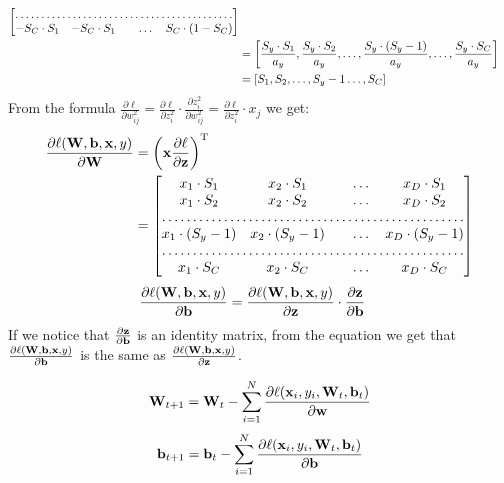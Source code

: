 \documentclass[10pt,a4paper]{article}
\begin{document}
\begin{enumerate}
\begin{align}
\begin{bmatrix}
    \hdotsfor{5} \\
        -S_C \cdot S_1    & 
-S_C \cdot S_1      &  & \dots & S_C \cdot (1 - S_C) \\
\end{bmatrix}\\
&= \left[ \frac{S_y\cdot S_1 }{a_y},\frac{S_y \cdot S_2 }{a_y}, \dots, \frac{S_y \cdot (S_y - 1) }{a_y}, \dots, \frac{S_y \cdot S_C }{a_y}\right]\\
&=  \left[ S_1 ,S_2, \dots, S_y - 1 \dots, S_C \right]
\end{align}
From the formula $\frac { \partial \ell } { \partial w _ { i j } ^ { 2 } } = \frac { \partial \ell } { \partial z _ { i } ^ { 2 } } \cdot \frac { \partial z _ { i } ^ { 2 } } { \partial w _ { i j } ^ { 2 } } = \frac { \partial \ell } { \partial z _ { i } ^ { 2 } } \cdot x _ { j }$ we get:
\begin{align}
\frac{\partial \ell (\mat{W}, \vect{b}, \vect{x}, y)}{\partial \mat{W}} 
&=\transpose{\left( \vect{x} \frac{\partial \ell}{\partial \vect{z}}\right)}\\
&=\begin{bmatrix}
    x_1 \cdot S_1   & 
x_2 \cdot S_1      &  & \dots  & x_D\cdot S_1 \\
 x_1 \cdot S_2    & 
x_2 \cdot S_2 &  & \dots & x_D \cdot S_2 \\
    \hdotsfor{5} \\
     x_1 \cdot (S_y -1)    & 
x_2 \cdot (S_y -1) &  & \dots & x_D \cdot (S_y -1) \\
    \hdotsfor{5} \\
        x_1 \cdot S_C    & 
x_2 \cdot S_C &     &  \dots& x_D \cdot  S_C \\
\end{bmatrix}\\
\end{align}
\begin{align}
\frac{\partial \ell(\textbf{\text{{W}}}, \textbf{\text{{b}}}, \textbf{\text{{x}}}, y)}{\partial \textbf{\text{{b}}}} &=
\frac{\partial \ell (\textbf{\text{{W}}}, \textbf{\text{{b}}}, \textbf{\text{{x}}}, y)}{\partial \textbf{\text{{z}}}}
\cdot \frac{\partial \textbf{\text{{z}}}}{\partial \textbf{\text{{b}}}}
\end{align}
If we notice that $\frac{\partial \textbf{\text{{z}}}}{\partial \textbf{\text{{b}}}}$ is an identity matrix, from the equation we get that $\frac{\partial \ell(\textbf{\text{{W}}}, \textbf{\text{{b}}}, \textbf{\text{{x}}}, y)}{\partial \textbf{\text{{b}}}}$ is the same as $\frac{\partial \ell(\textbf{\text{{W}}}, \textbf{\text{{b}}}, \textbf{\text{{x}}}, y)}{\partial \textbf{\text{{z}}}}$.

$$\textbf{\text{{W}}}_{t+1} = \textbf{\text{{W}}}_t - \sum_{i=1}^N\frac{\partial \ell(\textbf{\text{{x}}}_i, y_i, \textbf{\text{{W}}}_t, \textbf{\text{{b}}}_t)}{\partial \textbf{\text{{w}}}}$$
$$\textbf{\text{{b}}}_{t+1} = \textbf{\text{{b}}}_t - \sum_{i=1}^N\frac{\partial \ell(\textbf{\text{{x}}}_i, y_i, \textbf{\text{{W}}}_t, \textbf{\text{{b}}}_t)}{\partial \textbf{\text{{b}}}}$$
\end{enumerate}
\end{document}
